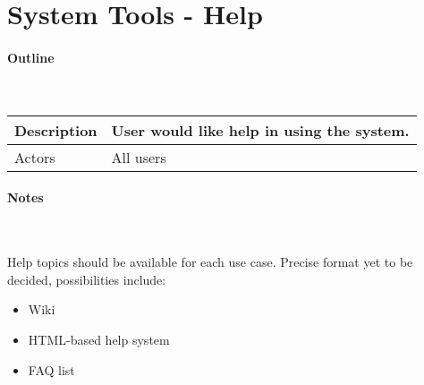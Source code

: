 \section*{System Tools - Help} %

\paragraph*{Outline} \

\begin{tabular}{ | l | l | }
\hline
Description & User would like help in using the system. \\ \hline
Actors & All users \\ \hline
\end{tabular}

\paragraph*{Notes} \

Help topics should be available for each use case. Precise format yet to be decided, possibilities include:

\begin{itemize}
\item Wiki
\item HTML-based help system
\item FAQ list
\end{itemize}

